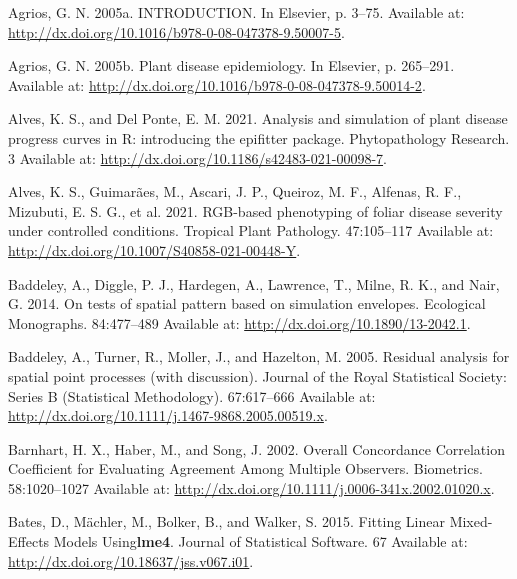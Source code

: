 \documentclass[
  letterpaper,
]{book}
\newlength{\cslhangindent}
\newlength{\cslentryspacingunit} %
\newenvironment{CSLReferences}[2] %
 {%
  \setlength{\parindent}{0pt}
  \ifodd #1
  \let\oldpar\par
  \def\par{\hangindent=\cslhangindent\oldpar}
  \fi
  \setlength{\parskip}{#2\cslentryspacingunit}
 }%
 {}
\begin{document}
\hypertarget{refs}{}
\begin{CSLReferences}{0}{0}
\leavevmode{}%
Agrios, G. N. 2005a. INTRODUCTION. In Elsevier, p. 3--75. Available at:
\url{http://dx.doi.org/10.1016/b978-0-08-047378-9.50007-5}.

\leavevmode{}%
Agrios, G. N. 2005b. Plant disease epidemiology. In Elsevier, p.
265--291. Available at:
\url{http://dx.doi.org/10.1016/b978-0-08-047378-9.50014-2}.

\leavevmode{}%
Alves, K. S., and Del Ponte, E. M. 2021. Analysis and simulation of
plant disease progress curves in R: introducing the epifitter package.
Phytopathology Research. 3 Available at:
\url{http://dx.doi.org/10.1186/s42483-021-00098-7}.

\leavevmode{}%
Alves, K. S., Guimarães, M., Ascari, J. P., Queiroz, M. F., Alfenas, R.
F., Mizubuti, E. S. G., et al. 2021. RGB-based phenotyping of foliar
disease severity under controlled conditions. Tropical Plant Pathology.
47:105--117 Available at:
\url{http://dx.doi.org/10.1007/S40858-021-00448-Y}.

\leavevmode{}%
Baddeley, A., Diggle, P. J., Hardegen, A., Lawrence, T., Milne, R. K.,
and Nair, G. 2014. On tests of spatial pattern based on simulation
envelopes. Ecological Monographs. 84:477--489 Available at:
\url{http://dx.doi.org/10.1890/13-2042.1}.

\leavevmode{}%
Baddeley, A., Turner, R., Moller, J., and Hazelton, M. 2005. Residual
analysis for spatial point processes (with discussion). Journal of the
Royal Statistical Society: Series B (Statistical Methodology).
67:617--666 Available at:
\url{http://dx.doi.org/10.1111/j.1467-9868.2005.00519.x}.

\leavevmode{}%
Barnhart, H. X., Haber, M., and Song, J. 2002. Overall Concordance
Correlation Coefficient for Evaluating Agreement Among Multiple
Observers. Biometrics. 58:1020--1027 Available at:
\url{http://dx.doi.org/10.1111/j.0006-341x.2002.01020.x}.

\leavevmode{}%
Bates, D., Mächler, M., Bolker, B., and Walker, S. 2015. Fitting Linear
Mixed-Effects Models Using{\textbf{lme4}}. Journal of Statistical
Software. 67 Available at:
\url{http://dx.doi.org/10.18637/jss.v067.i01}.


\end{CSLReferences}
\end{document}
